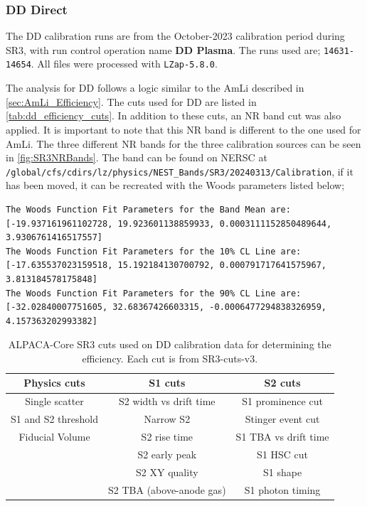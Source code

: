 \subsubsection{DD Direct}
The DD calibration runs are from the October-2023 calibration period during SR3, with run control operation name \textbf{DD Plasma}.
The runs used are; \lstinline{14631-14654}.
All files were processed with \lstinline{LZap-5.8.0}.

The analysis for DD follows a logic similar to the AmLi described in \autoref{sec:AmLi_Efficiency}.
The cuts used for DD are listed in \autoref{tab:dd_efficiency_cuts}.
In addition to these cuts, an NR band cut was also applied.
It is important to note that this NR band is different to the one used for AmLi. The three different NR bands for the three calibration sources can be seen in \autoref{fig:SR3NRBands}.
The band can be found on NERSC at \lstinline{/global/cfs/cdirs/lz/physics/NEST_Bands/SR3/20240313/Calibration}, if it has been moved, it can be recreated with the Woods parameters listed below;
\begin{lstlisting}
The Woods Function Fit Parameters for the Band Mean are:  [-19.937161961102728, 19.923601138859933, 0.0003111152850489644, 3.9306761416517557]
The Woods Function Fit Parameters for the 10% CL Line are:  [-17.635537023159518, 15.192184130700792, 0.000791717641575967, 3.813184578175848]
The Woods Function Fit Parameters for the 90% CL Line are:  [-32.02840007751605, 32.68367426603315, -0.0006477294838326959, 4.157363202993382]
\end{lstlisting}
\begin{table}
	\centering
	\begin{tabular}{c|c|c}
		Physics cuts        & S1 cuts                  & S2 cuts              \\
		\hline
		Single scatter      & S2 width vs drift time   & S1 prominence cut    \\
		S1 and S2 threshold & Narrow S2                & Stinger event cut    \\
		Fiducial Volume     & S2 rise time             & S1 TBA vs drift time \\
		                    & S2 early peak            & S1 HSC cut           \\
		                    & S2 XY quality            & S1 shape             \\
		                    & S2 TBA (above-anode gas) & S1 photon timing     \\
	\end{tabular}
	\caption{ALPACA-Core SR3 cuts used on DD calibration data for determining the efficiency.
		Each cut is from SR3-cuts-v3.
	}
	\label{tab:dd_efficiency_cuts}
\end{table}
